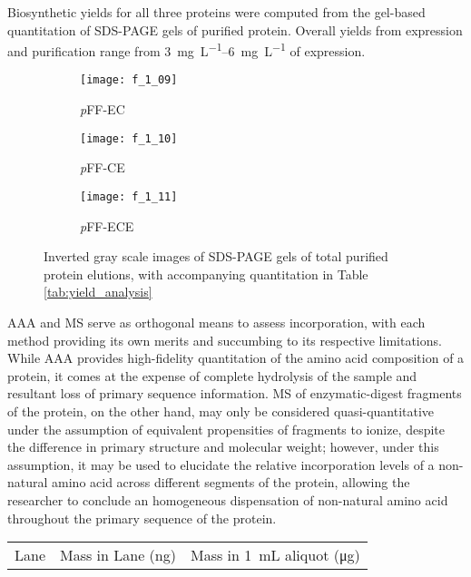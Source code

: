 \begin{refsection}
Biosynthetic yields for all three proteins were computed from the gel-based
quantitation of SDS-PAGE gels of purified protein. Overall yields from
expression and purification range from \SIrange{3}{6}{\mg\per\L} of
expression.
\begin{figure}[h!]
    \centering
    \begin{subfigure}[b]{0.3\textwidth}
        \texttt{[image: f\_1\_09]}
        \caption{\emph{p}FF-EC}
        \label{fig:A}
    \end{subfigure}
    \begin{subfigure}[b]{0.3\textwidth}
        \texttt{[image: f\_1\_10]}
        \caption{\emph{p}FF-CE}
        \label{fig:B}
    \end{subfigure}
    \begin{subfigure}[b]{0.3\textwidth}
        \texttt{[image: f\_1\_11]}
        \caption{\emph{p}FF-ECE}
        \label{fig:C}
    \end{subfigure}
    \caption{Inverted gray scale images of SDS-PAGE gels of total purified
    protein elutions, with accompanying quantitation in Table
    \ref{tab:yield_analysis}}\label{fig:purification_gels}
\end{figure}
AAA and MS serve as orthogonal means to assess incorporation, with each method
providing its own merits and succumbing to its respective limitations. While AAA
provides high-fidelity quantitation of the amino acid composition of a protein,
it comes at the expense of complete hydrolysis of the sample and resultant loss
of primary sequence information. MS of enzymatic-digest fragments of the
protein, on the other hand, may only be considered quasi-quantitative under the
assumption of equivalent propensities of fragments to ionize, despite the
difference in primary structure and molecular weight; however, under this
assumption, it may be used to elucidate the relative incorporation levels of a
non-natural amino acid across different segments of the protein, allowing the
researcher to conclude an homogeneous dispensation of non-natural amino acid
throughout the primary sequence of the protein.
\begin{table}[h!]
    \centering
\begin{tabular}{ lllllll }
  \hline
  Lane & 
  \multicolumn{3}{c}{Mass in Lane (\si{\ng})} & 
  \multicolumn{3}{c}{Mass in \SI{1}{\mL} aliquot (\si{\ug})} \\

\end{tabular}
\end{table}
\end{refsection}
